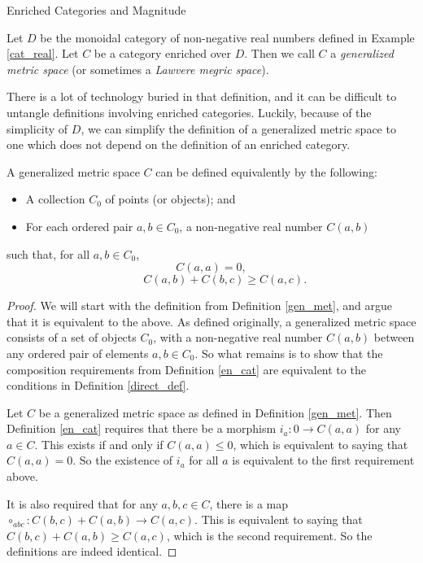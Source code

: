 \documentclass[12pt]{pom_thesis}
\begin{document}
\begin{chapter}{Enriched Categories and Magnitude}
\begin{defn}\label{gen_met}
Let $D$ be the monoidal category of non-negative real numbers defined in Example \ref{cat_real}. Let $C$ be a category enriched over $D$. Then we call $C$ a \emph{generalized metric space} (or sometimes a \emph{Lawvere megric space}).
\end{defn}
There is a lot of technology buried in that definition, and it can be difficult to untangle definitions involving enriched categories. Luckily, because of the simplicity of $D$, we can simplify the definition of a generalized metric space to one which does not depend on the definition of an enriched category.
\begin{thm}\label{direct_def}
A generalized metric space $C$ can be defined equivalently by the following:
\begin{itemize}
\item A collection $C_0$ of points (or objects); and
\item For each ordered pair $a,b \in C_0$, a non-negative real number $C(a,b)$
\end{itemize}
such that, for all $a,b \in C_0$,
\[C(a,a) = 0,
\]
\[\hspace{1cm} C(a,b) + C(b,c) \geq C(a,c).
\]
\end{thm}
\begin{proof}
We will start with the definition from Definition \ref{gen_met}, and argue that it is equivalent to the above. As defined originally, a generalized metric space consists of a set of objects $C_0$, with a non-negative real number $C(a,b)$ between any ordered pair of elements $a,b \in C_0$. So what remains is to show that the composition requirements from Definition \ref{en_cat} are equivalent to the conditions in Definition  \ref{direct_def}. 

Let $C$ be a generalized metric space as defined in Definition \ref{gen_met}. Then Definition \ref{en_cat} requires that there be a morphism $i_a:0 \rightarrow C(a,a)$ for any $a \in C$. This exists if and only if $C(a,a) \leq 0$, which is equivalent to saying that $C(a,a)=0$. So the existence of $i_a$ for all $a$ is equivalent to the first requirement above.

It is also required that for any $a,b,c \in C$, there is a map $\circ_{abc}: C(b,c) + C(a,b) \rightarrow C(a,c)$. This is equivalent to saying that $C(b,c) + C(a,b) \geq C(a,c)$, which is the second requirement. So the definitions are indeed identical.
\end{proof}


\end{chapter}
\end{document}
